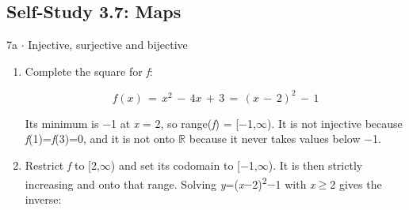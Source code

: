 \documentclass[11pt]{article}
\begin{document}
\begin{keepsection}\subsection{Self-Study 3.7: Maps}

\begin{workedbox}{7a \ensuremath{\cdot} Injective, surjective and bijective}
\begin{enumerate}
\item {}
Complete the square for \textit{f}:

\begin{equation*}{f}({x})\, =\, {x}^{2}\, -\, 4{x}\, +\, 3\, =\, ({x}\, -\, 2)^{2}\, -\, 1\end{equation*}

Its minimum is \ensuremath{-}1 at \textit{x} = 2, so range(\textit{f}) = [\ensuremath{-}1,\ensuremath{\infty}). It is not injective because \textit{f}(1)=\textit{f}(3)=0, and it is not onto \ensuremath{\mathbb{R}} because it never takes values below \ensuremath{-}1.
\item {}
Restrict \textit{f} to [2,\ensuremath{\infty}) and set its codomain to [\ensuremath{-}1,\ensuremath{\infty}). It is then strictly increasing and onto that range. Solving \textit{y}=(\textit{x}\ensuremath{-}2)\textsuperscript{2}\ensuremath{-}1 with \textit{x}\ensuremath{\geq}2 gives the inverse:


\end{enumerate}
\end{workedbox}
\end{keepsection}
\end{document}
